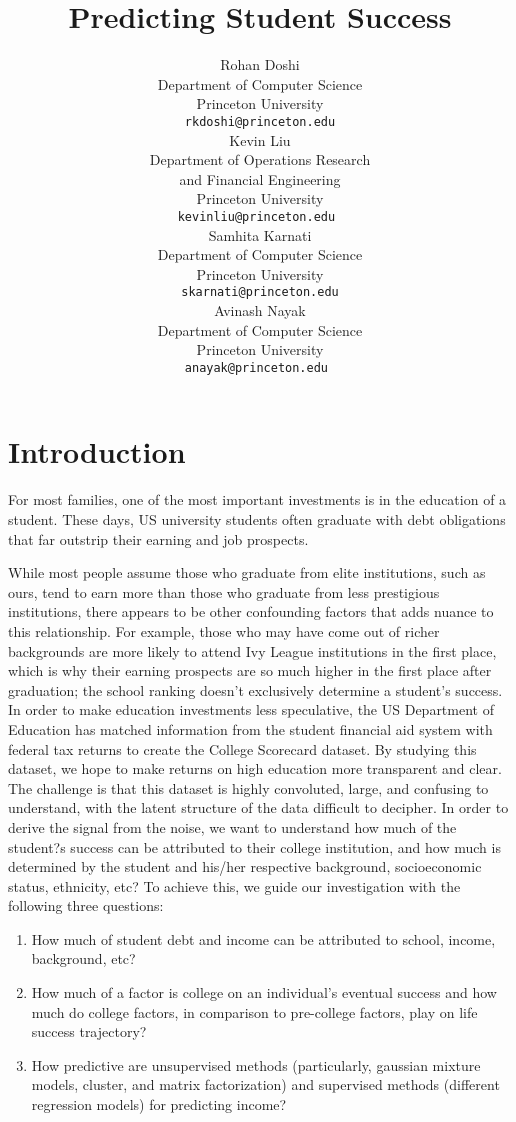 \documentclass{article} %
\title{Predicting Student Success}
\author{
Rohan Doshi\\
Department of Computer Science\\
Princeton University\\
\texttt{rkdoshi@princeton.edu} \\
\And
Kevin Liu  \\
Department of Operations Research \\ and Financial Engineering \\
Princeton University\\
\texttt{kevinliu@princeton.edu } \\
\And
Samhita Karnati \\
Department of Computer Science\\
Princeton University\\
\texttt{skarnati@princeton.edu} \\
\And
Avinash Nayak  \\
Department of Computer Science\\
Princeton University\\
\texttt{anayak@princeton.edu } \\
}
\begin{document}
\maketitle

\section{Introduction}



For most families, one of the most important investments is in the education of a student. These days, US university students often graduate with debt obligations that far outstrip their earning and job prospects. 

While most people assume those who graduate from elite institutions, such as ours, tend to earn more than those who graduate from less prestigious institutions, there appears to be other confounding factors that adds nuance to this relationship. For example, those who may have come out of richer backgrounds are more likely to attend Ivy League institutions in the first place, which is why their earning prospects are so much higher in the first place after graduation; the school ranking doesn't exclusively determine a student's success. In order to make education investments less speculative, the US Department of Education has matched information from the student financial aid system with federal tax returns to create the College Scorecard dataset. By studying this dataset, we hope to make returns on high education more transparent and clear. The challenge is that this dataset is highly convoluted, large, and confusing to understand, with the latent structure of the data difficult to decipher. In order to derive the signal from the noise, we want to understand how much of the student?s success can be attributed to their college institution, and how much is determined by the student and his/her respective background, socioeconomic status, ethnicity, etc? To achieve this, we guide our investigation with the following three questions:
\begin{enumerate}
	\item How much of student debt and income can be attributed to school, income, background, etc?
	\item How much of a factor is college on an individual's eventual success and how much do college factors, in comparison to pre-college factors, play on life success trajectory?
	\item How predictive are unsupervised methods (particularly, gaussian mixture models, cluster, and matrix factorization) and supervised methods (different regression models) for predicting income?
\end{enumerate}
\end{document}

